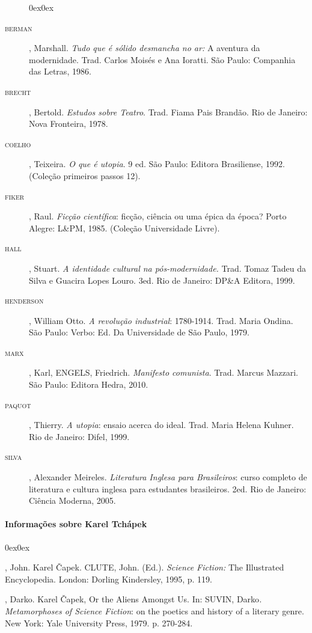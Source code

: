 \documentclass[11pt]{hedrabook}
\begin{document}
\begin{description}0ex\parsep0ex
\newcommand{\tit}[1]{\item[\textnormal{\textsc{\MakeTextLowercase{#1}}}]}
\newcommand{\titidem}{\item[\line(1,0){25}]}

\tit{BERMAN}, Marshall. \textit{Tudo que é sólido desmancha no ar:} A aventura da
modernidade. Trad. Carlos Moisés e Ana Ioratti. São Paulo: Companhia
das Letras, 1986.

\tit{BRECHT}, Bertold. \textit{Estudos sobre Teatro}. Trad. Fiama Pais Brandão. Rio
de Janeiro: Nova Fronteira, 1978.

\tit{COELHO}, Teixeira. \textit{O que é utopia}.\textbf{} 9 ed. São Paulo: Editora
Brasiliense, 1992. (Coleção primeiros passos 12).

\tit{FIKER}, Raul. \textit{Ficção científica}: ficção, ciência ou uma épica da
época?\textit{} Porto Alegre: L\&PM, 1985.  (Coleção Universidade Livre).

\tit{HALL}, Stuart. \textit{A identidade cultural na pós-modernidade.} Trad. Tomaz
Tadeu da Silva e Guacira Lopes Louro. 3ed. Rio de Janeiro: DP\&A Editora, 1999.

\tit{HENDERSON}, William Otto. \textit{A revolução industrial}: 1780-1914. Trad.
Maria Ondina.\textit{} São Paulo: Verbo: Ed. Da Universidade de São Paulo,
1979.

\tit{MARX}, Karl, ENGELS, Friedrich. \textit{Manifesto comunista}. Trad. Marcus
Mazzari. São Paulo: Editora Hedra, 2010.

\tit{PAQUOT}, Thierry. \textit{A utopia}:\textit{} ensaio acerca do ideal. Trad.
Maria Helena Kuhner. Rio de Janeiro: Difel, 1999.

\tit{SILVA}, Alexander Meireles. \textit{Literatura Inglesa para Brasileiros}: curso
completo de literatura e cultura inglesa para estudantes brasileiros. 2ed. Rio
de Janeiro: Ciência Moderna, 2005.

\end{description}

\paragraph{Informações sobre Karel Tchápek}

\begin{description}0ex\parsep0ex
\newcommand{\tit}[1]{\item[\textnormal{\textsc{\MakeTextLowercase{#1}}}]}
\newcommand{\titidem}{\item[\line(1,0){25}]}

\tit{CLUTE}, John. Karel Čapek. CLUTE, John. (Ed.). \textit{Science Fiction:} The
Illustrated Encyclopedia. London: Dorling Kindersley, 1995, p. 119.

\tit{SUVIN}, Darko. Karel Čapek, Or the Aliens Amongst Us. In: SUVIN, Darko\textit{.
Metamorphoses of Science Fiction}: on the poetics and history of a literary
genre. New York: Yale University Press, 1979. p. 270-284.

\end{description}
\end{document}
